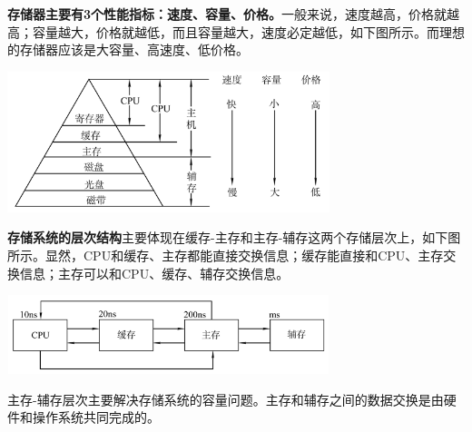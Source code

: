 {{\textbf{存储器主要有3个性能指标：速度、容量、价格。}}{一般来说，速度越高，价格就越高；容量越大，价格就越低，而且容量越大，速度必定越低，}}{如下图}{所示。而理想的存储器应该是大容量、高速度、低价格。}

\includegraphics[width=3.69792in,height=1.61458in]{png-jpeg-pics/99E962691CE4528C6959B97044926CC7.png}

\textbf{{存储系统的层次结构}}{主要体现在缓存-主存和主存-辅存这两个存储层次上，如下图所示。显然，CPU和缓存、主存都能直接交换信息；缓存能直接和CPU、主存交换信息；主存可以和CPU、缓存、辅存交换信息。}

\includegraphics[width=3.69792in,height=0.90625in]{png-jpeg-pics/E1DED16052D8BEF6EFA4905541EAD992.png}

{主存-辅存层次主要解决存储系统的容量问题。主存和辅存之间的数据交换是由硬件和操作系统共同完成的。}

